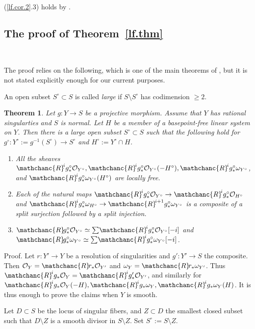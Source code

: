 \documentclass{amsart}
\newtheorem{thm}{Theorem}%
\theoremstyle{definition}
\theoremstyle{remark}
\renewcommand{\o}[0]{{\mathcal O}}
\newcommand{\tsum}[0]{\textstyle{\sum}}
\newcommand{\myR}{{\mathchanc{R}\!}}
\begin{document}
    (\ref{lf.cor.2}.3) holds by \cite[3.1]{k-hdi2}.
    \medskip

  

  \subsection*{The proof of  Theorem~\ref{lf.thm}}{\ }
 \medskip

 
  
 The proof  relies on the following, which  is one of  the main theorems of \cite{k-hdi2}, but it is not stated explicitly enough for our current purposes.

  An open subset $S^\circ\subset S$ is called {\it large}
  if $S\setminus S^\circ$ has codimension $\geq 2$.

 

 \begin{thm} \label{hdi2.thm} Let $g:Y\to S$ be a  projective morphism. Assume that $Y$ has  rational singularties and  $S$ is normal. Let $H$ be a  member of a basepoint-free linear system on $Y$. Then there is a large open subset
   $S^\circ\subset S$ such that the following hold for  $g^\circ: Y^\circ:=g^{-1}(S^\circ)\to S^\circ$ and $H^\circ:=Y^\circ\cap H$.
   \begin{enumerate}
\item All the sheaves  $\myR^ig^\circ_*\o_{Y^\circ}, \myR^ig^\circ_*\o_{Y^\circ}(-H^\circ), 
  \myR^ig^\circ_*\omega_{Y^\circ}$, and $ \myR^ig^\circ_*\omega_{Y^\circ}(H^\circ)$ are locally free.
\item Each of the natural maps
  $\myR^ig^\circ_*\o_{Y^\circ}\to \myR^ig^\circ_*\o_{H^\circ}$ 
  and
 $ \myR^ig^\circ_*\omega_{H^\circ}\to
 \myR^{i+1}g^\circ_*\omega_{Y^\circ}$
 is a composite of a split surjection followed by a split injection.
 \item $\myR g^\circ_*\o_{Y^\circ}\simeq \tsum\myR^ig^\circ
   _*\o_{Y^\circ}[-i]$ and
   $\myR g^\circ_*\omega_{Y^\circ}\simeq \tsum\myR^ig^\circ
 _*\omega_{Y^\circ}[-i]$.
   \end{enumerate}
   \end{thm}

 Proof.    Let $r:Y'\to Y$ be a resolution of singularities and $g':Y'\to S$ the composite.
  Then $\o_Y=\myR r_*\o_{Y'}$ and
 $\omega_Y=\myR r_*\omega_{Y'}$.
 Thus $\myR^ig_*\o_Y=\myR^ig'_*\o_{Y'}$, and similarly for
 $\myR^ig_*\o_Y(-H), \myR^ig_*\omega_Y, \myR^ig_*\omega_Y(H)$.
 It is thus enough to prove the claims when $Y$ is smooth.


 Let $D\subset S$ be the locus of singular fibers, and
 $Z\subset D$ the smallest closed subset  such that
 $D\setminus Z$ is a smooth divisor in $S \setminus Z$.
 Set $S^\circ:=S \setminus Z$.
\end{document}
